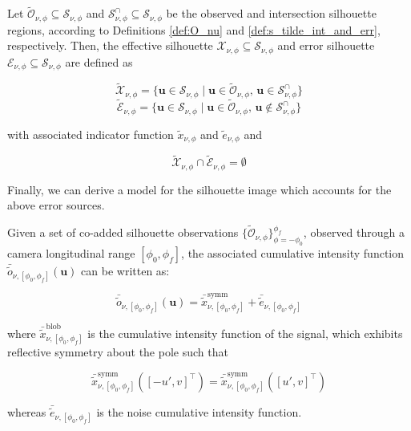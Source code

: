 \begin{definition}
    Let $\widetilde{\mathcal{O}}_{\nu,\phi}\subseteq \mathcal{S}_{\nu,\phi}$ and $\mathcal{S}^\cap_{\nu,\phi}\subseteq \mathcal{S}_{\nu,\phi}$ be the observed and intersection silhouette regions, according to Definitions \ref{def:O_nu} and \ref{def:s_tilde_int_and_err}, respectively. Then, the effective silhouette $\mathcal{X}_{\nu,\phi} \subseteq \mathcal{S}_{\nu,\phi}$ and error silhouette $\mathcal{E}_{\nu,\phi} \subseteq \mathcal{S}_{\nu,\phi}$ are defined as

    \begin{equation}
        \widetilde{\mathcal{X}}_{\nu,\phi} = \{ \mathbf{u}\in\mathcal{S}_{\nu,\phi} \; | \; \mathbf{u}\in \widetilde{\mathcal{O}}_{\nu,\phi},\, \mathbf{u}\in\mathcal{S}^\cap_{\nu,\phi} \}
    \end{equation}
    \begin{equation}
\widetilde{\mathcal{E}}_{\nu,\phi} = \{ \mathbf{u}\in\mathcal{S}_{\nu,\phi} \; | \; \mathbf{u}\in \widetilde{\mathcal{O}}_{\nu,\phi},\, \mathbf{u}\notin\mathcal{S}^\cap_{\nu,\phi} \}
    \end{equation}

    with associated indicator function $\tilde{x}_{\nu,\phi}$ and $\tilde{e}_{\nu,\phi}$ and

    \begin{equation}
    \label{eq:X_cap_E}
        \widetilde{\mathcal{X}}_{\nu,\phi} \cap \widetilde{\mathcal{E}}_{\nu,\phi} = \emptyset
    \end{equation}
\end{definition}

Finally, we can derive a model for the silhouette image which accounts for the above error sources.

\begin{theorem}
    \label{th:x_+_e}
    Given a set of co-added silhouette observations $\{ \widetilde{\mathcal{O}}_{\nu,\phi} \}_{\phi=-\phi_0}^{\phi_f}$, observed through a camera longitudinal range $[\phi_0,\phi_f]$, the associated cumulative intensity function $\bar{\tilde{o}}_{\nu,[\phi_0,\phi_f]}(\mathbf{u})$ can be written as:

\begin{equation}
    \bar{\tilde{o}}_{\nu,[\phi_0,\phi_f]}(\mathbf{u}) = \bar{\tilde{x}}^{\mathrm{symm}}_{\nu,[\phi_0,\phi_f]} + \bar{\tilde{e}}_{\nu,[\phi_0,\phi_f]}
\end{equation}

    where $\bar{\tilde{x}}^{\mathrm{blob}}_{\nu,[\phi_0,\phi_f]}$ is the cumulative intensity function of the signal, which exhibits reflective symmetry about the pole such that

    \begin{equation}
        \bar{\tilde{x}}^{\mathrm{symm}}_{\nu,[\phi_0,\phi_f]}([-u',v]^\top) = \bar{\tilde{x}}^{\mathrm{symm}}_{\nu,[\phi_0,\phi_f]}([u',v]^\top)
    \end{equation}

    whereas $\bar{\tilde{e}}_{\nu,[\phi_0,\phi_f]}$ is the noise cumulative intensity function.
    
\end{theorem}

